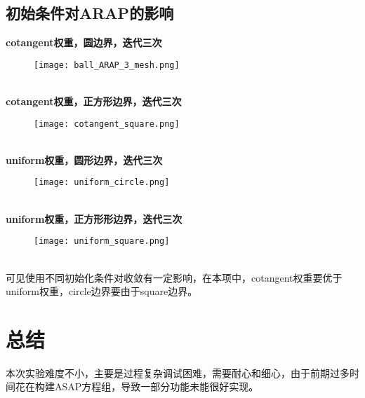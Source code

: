 \documentclass[14pt]{scrartcl} %
\begin{document}
\subsection{初始条件对ARAP的影响}
\textbf{cotangent权重，圆边界，迭代三次}
\begin{figure}[h] %
	\centering
	\texttt{[image: ball\_ARAP\_3\_mesh.png]} %
\end{figure}
\\
\textbf{cotangent权重，正方形边界，迭代三次}
\begin{figure}[h] %
	\centering
	\texttt{[image: cotangent\_square.png]} %
\end{figure}
\pagebreak
\\
\textbf{uniform权重，圆形边界，迭代三次}
\begin{figure}[h] %
	\centering
	\texttt{[image: uniform\_circle.png]} %
\end{figure}
\\
\textbf{uniform权重，正方形形边界，迭代三次}
\begin{figure}[h] %
	\centering
	\texttt{[image: uniform\_square.png]} %
\end{figure}
\\
可见使用不同初始化条件对收敛有一定影响，在本项中，cotangent权重要优于uniform权重，circle边界要由于square边界。

\pagebreak
\section{总结}
本次实验难度不小，主要是过程复杂调试困难，需要耐心和细心，由于前期过多时间花在构建ASAP方程组，导致一部分功能未能很好实现。



\end{document}
